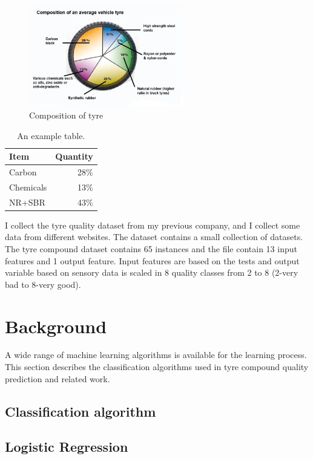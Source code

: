 \documentclass{article}
\begin{document}
\begin{figure}[ht!]
  \centering
  \includegraphics[width=0.6\textwidth]{tyre.jpg}
  \caption{Composition of tyre}
\end{figure}





\begin{table}
\centering
\begin{tabular}{l|r}
Item & Quantity \\\hline
Carbon & 28\% \\
Chemicals & 13\% \\
NR+SBR & 43\%
\end{tabular}
\caption{\label{tab:widgets}An example table.}
\end{table}

I collect the tyre quality dataset from my previous company, and I collect some data from different websites. The dataset contains a small collection of datasets. The tyre compound dataset contains 65 instances and the file contain 13 input features and 1 output feature. Input features are based on the tests and output variable based on sensory data is scaled in 8 quality classes from 2 to 8 (2-very bad to 8-very good). 

\section{Background}

 A wide range of machine learning algorithms is available for the learning process. This section describes the classification algorithms used in tyre compound quality prediction and related work.

 \subsection{Classification algorithm }

 \subsection{Logistic Regression}
\end{document}
